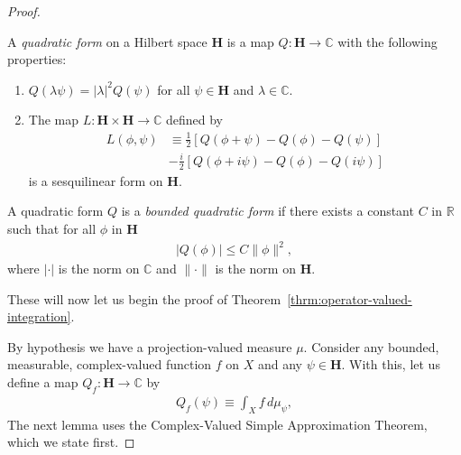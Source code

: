 \begin{proof}
\begin{definition}
    \label{def:bounded-quadratic-form}
    \leanok
    A \textit{quadratic form} on a Hilbert space $\mathbf{H}$ is a map $Q : \mathbf{H} \rightarrow \mathbb{C}$ with the following properties:
    \begin{enumerate}
        \item $Q(\lambda\psi) = \lvert\lambda\rvert^2 Q(\psi)$ for all $\psi \in \mathbf{H}$ and $\lambda \in \mathbb{C}$.
        \item The map $L : \mathbf{H} \times \mathbf{H} \rightarrow \mathbb{C}$ defined by
        \begin{align}
            L(\phi, \psi) &\equiv \frac{1}{2} \left[ Q(\phi + \psi) - Q(\phi) - Q(\psi) \right] \\
                          &-\frac{i}{2} \left[ Q(\phi + i\psi) - Q(\phi) - Q(i\psi) \right]
        \end{align}
        is a sesquilinear form on $\mathbf{H}$.
    \end{enumerate}
    A quadratic form $Q$ is a \textit{bounded quadratic form} if there exists a constant $C$ in $\mathbb{R}$ such that for all $\phi$ in $\mathbf{H}$
    \begin{align}
        \lvert Q(\phi) \rvert \le C \|\phi\|^2,
    \end{align}
    where $\lvert \cdot \rvert$ is the norm on $\mathbb{C}$ and $\|\cdot\|$ is the norm on $\mathbf{H}$.
\end{definition}

These will now let us begin the proof of Theorem~\ref{thrm:operator-valued-integration}.

By hypothesis we have a projection-valued measure $\mu$. Consider any bounded, measurable, complex-valued function $f$ on $X$ and any $\psi \in \mathbf{H}$. With this, let us define a map $Q_f : \mathbf{H} \rightarrow \mathbb{C}$ by
\begin{align}
    Q_f(\psi) \equiv \int_X f \, d\mu_\psi,
\end{align}
The next lemma uses the Complex-Valued Simple Approximation Theorem, which we state first.


\end{proof}
